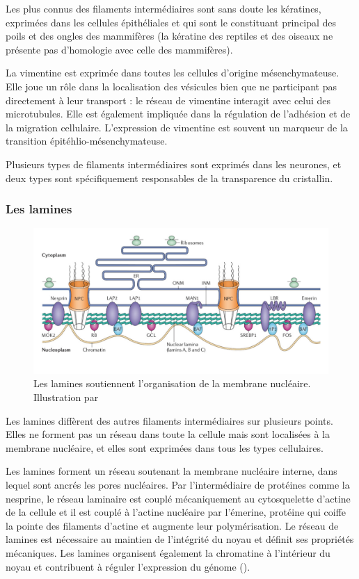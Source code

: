 Les plus connus des filaments intermédiaires sont sans doute les kératines, exprimées dans les cellules épithéliales et qui sont le constituant principal des poils et des ongles des mammifères (la kératine des reptiles et des oiseaux ne présente pas d'homologie avec celle des mammifères). 

La vimentine est exprimée dans toutes les cellules d'origine mésenchymateuse. Elle joue un rôle dans la localisation des vésicules bien que ne participant pas directement à leur transport : le réseau de vimentine interagit avec celui des microtubules. Elle est également impliquée dans la régulation de l'adhésion et de la migration cellulaire. 
L'expression de vimentine est souvent un marqueur de la transition épitéhlio-mésenchymateuse. 

Plusieurs types de filaments intermédiaires sont exprimés dans les neurones, et deux types sont spécifiquement responsables de la transparence du cristallin. 

\subsubsection{Les lamines}
\begin{figure}
\includegraphics[scale=1.5]{Structure_and_function_of_the_nuclear_lamina.jpg}
\caption{Les lamines soutiennent l'organisation de la membrane nucléaire. Illustration par  \cite{coutinho}}
\end{figure}
Les lamines diffèrent des autres filaments intermédiaires sur plusieurs points. Elles ne forment pas un réseau dans toute la cellule mais sont localisées à la membrane nucléaire, et elles sont exprimées dans tous les types cellulaires. 

Les lamines forment un réseau soutenant la membrane nucléaire interne, dans lequel sont ancrés les pores nucléaires. Par l'intermédiaire de protéines comme la nesprine, le réseau laminaire est couplé mécaniquement au cytosquelette d'actine de la cellule et il est couplé à l'actine nucléaire par l'émerine, protéine qui coiffe la pointe des filaments d'actine et augmente leur polymérisation. 
Le réseau de lamines est nécessaire au maintien de l'intégrité du noyau et définit ses propriétés mécaniques. 
Les lamines organisent également la chromatine à l'intérieur du noyau et contribuent à réguler l'expression du génome (\cite{dechat_2008}).

